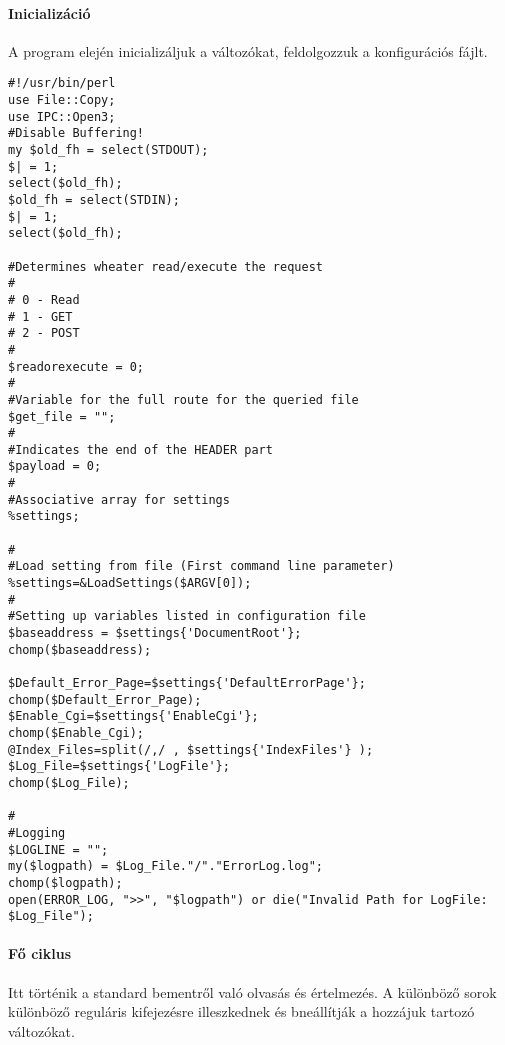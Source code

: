 \documentclass[12pt,a4paper]{article}
\begin{document}
\paragraph{Inicializáció} A program elején inicializáljuk a változókat, feldolgozzuk a konfigurációs fájlt.
\begin{lstlisting}
#!/usr/bin/perl 
use File::Copy;
use IPC::Open3;
#Disable Buffering!
my $old_fh = select(STDOUT);
$| = 1;
select($old_fh);
$old_fh = select(STDIN);
$| = 1;
select($old_fh);

#Determines wheater read/execute the request
#
# 0 - Read
# 1 - GET
# 2 - POST
#
$readorexecute = 0;
#
#Variable for the full route for the queried file
$get_file = "";
#
#Indicates the end of the HEADER part
$payload = 0;
#
#Associative array for settings
%settings;

#
#Load setting from file (First command line parameter)
%settings=&LoadSettings($ARGV[0]);
#
#Setting up variables listed in configuration file
$baseaddress = $settings{'DocumentRoot'};
chomp($baseaddress);

$Default_Error_Page=$settings{'DefaultErrorPage'};
chomp($Default_Error_Page);
$Enable_Cgi=$settings{'EnableCgi'};
chomp($Enable_Cgi);
@Index_Files=split(/,/ , $settings{'IndexFiles'} );
$Log_File=$settings{'LogFile'};  
chomp($Log_File);

#
#Logging
$LOGLINE = "";
my($logpath) = $Log_File."/"."ErrorLog.log";
chomp($logpath);
open(ERROR_LOG, ">>", "$logpath") or die("Invalid Path for LogFile: $Log_File");
\end{lstlisting}
\paragraph{Fő ciklus} Itt történik a standard bementről való olvasás és értelmezés. A  különböző sorok különböző reguláris kifejezésre illeszkednek és bneállítják a hozzájuk tartozó változókat.
\end{document}
